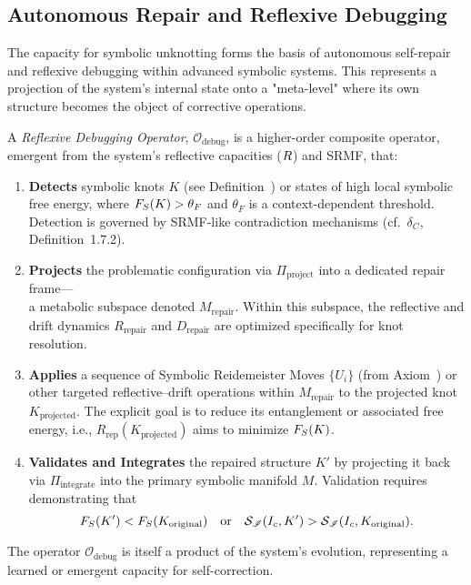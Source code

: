 \subsection{Autonomous Repair and Reflexive Debugging}
\label{subsection:bk8_observer_relative_geometry}
The capacity for symbolic unknotting forms the basis of autonomous self-repair and reflexive debugging within advanced symbolic systems. This represents a projection of the system's internal state onto a "meta-level" where its own structure becomes the object of corrective operations.
\begin{definition}
\label{definition:bk8_symbolic_stress_tensor}
A \emph{Reflexive Debugging Operator}, $\mathcal{O}_{\text{debug}}$, is a higher-order composite operator, emergent from the system's reflective capacities ($R$) and SRMF, that:
\begin{enumerate}
  \item \textbf{Detects} symbolic knots \( K \) (see Definition~) or 
  states of high local symbolic free energy, 
  where \( F_S(K) > \theta_F \) and \( \theta_F \) is a context-dependent threshold.
  Detection is governed by SRMF-like contradiction mechanisms (cf.~\( \delta_C \), Definition~1.7.2).
  \item \textbf{Projects} the problematic configuration via 
  \( \Pi_{\text{project}} \) into a dedicated repair frame— \\
  \hspace*{1.5em}a metabolic subspace denoted \( M_{\text{repair}} \).
  Within this subspace, the reflective and drift dynamics 
  \( R_{\text{repair}} \) and \( D_{\text{repair}} \) 
  are optimized specifically for knot resolution.
  \item \textbf{Applies} a sequence of Symbolic Reidemeister Moves 
  \( \{U_i\} \) (from Axiom~) 
  or other targeted reflective–drift operations within \( M_{\text{repair}} \) 
  to the projected knot \( K_{\text{projected}} \). 
  The explicit goal is to reduce its entanglement or associated free energy, i.e.,
  \( R_{\text{rep}}(K_{\text{projected}}) \) aims to minimize \( F_S(K) \).
  \item \textbf{Validates and Integrates} the repaired structure \( K' \) by projecting it back 
  via \( \Pi_{\text{integrate}} \) into the primary symbolic manifold \( M \). 
  Validation requires demonstrating that
  \[
    F_S(K') < F_S(K_{\text{original}}) 
    \quad \text{or} \quad 
    \mathcal{S}_{\mathscr{I}}(I_c, K') > \mathcal{S}_{\mathscr{I}}(I_c, K_{\text{original}}).
  \]
\end{enumerate}
The operator $\mathcal{O}_{\text{debug}}$ is itself a product of the system's evolution, representing a learned or emergent capacity for self-correction.
\end{definition}

